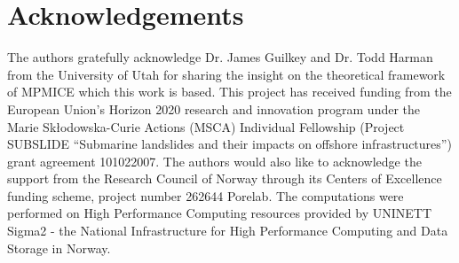 \documentclass[preprint,12pt]{elsarticle}
\begin{document}
\section{\textsf{Acknowledgements}}
The authors gratefully acknowledge Dr. James Guilkey and Dr. Todd Harman from the University of Utah for sharing the insight on the theoretical framework of MPMICE which this work is based. This project has received funding from the European Union’s Horizon 2020 research and innovation program under the Marie Skłodowska-Curie Actions (MSCA) Individual Fellowship (Project SUBSLIDE “Submarine landslides and their impacts on offshore infrastructures”) grant agreement 101022007. The authors would also like to acknowledge the support from the Research Council of Norway through its Centers of Excellence funding scheme, project number 262644 Porelab. The computations were performed on High Performance Computing resources provided by UNINETT Sigma2 - the National Infrastructure for High Performance Computing and Data Storage in Norway.

\end{document}
